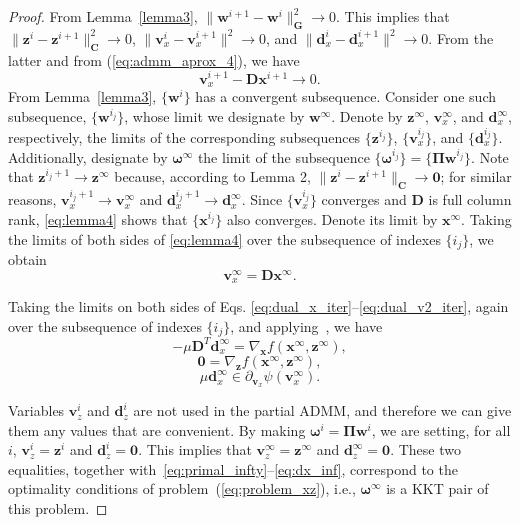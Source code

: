 \documentclass[10pt,twocolumn,twoside]{IEEEtran}
\newcommand{\x}{\mathbf{x}} %
\newcommand{\z}{\mathbf{z}} %
\newcommand{\vs}{\mathbf{v}} %
\newcommand{\dv}{\mathbf{d}} %
\newcommand{\D}{\mathbf{D}} %
\newcommand{\wt}{\mathbf{w}} %
\newcommand{\C}{\mathbf{C}} %
\newcommand{\G}{\mathbf{G}} %
\begin{document}
\begin{proof}
	From Lemma~\ref{lemma3}, $\|\wt^{i+1} - \wt^i \|^2_{\G} \to 0$. This implies that $\| \z^i - \z^{i+1} \|^2_\C \to 0$, $\| \vs_x^i - \vs_x^{i+1} \|^2 \to 0$, and $\| \dv_x^i - \dv_x^{i+1} \|^2 \to 0$. From the latter and from (\ref{eq:admm_aprox_4}), we have
	\begin{equation} \label{eq:lemma4}
	\vs_x^{i+1} - \D \x^{i+1} \to 0.
	\end{equation}
	From Lemma~\ref{lemma3}, $\{\wt^i\}$ has a convergent subsequence. Consider one such subsequence, $\{\wt^{i_j}\}$, whose limit we designate by $\wt^{\infty}$. Denote by $\z^{\infty}$, $\vs_x^{\infty}$, and $\dv_x^{\infty}$, respectively, the limits of the corresponding subsequences $\{\z^{i_j}\}$, $\{\vs_x^{i_j}\}$, and $\{\dv_x^{i_j}\}$. Additionally, designate by $\bm{\omega}^{\infty}$ the limit of the subsequence $\{\bm{\omega}^{i_j}\} = \{\bm{\Pi} \wt^{i_j}\}$. Note that $\z^{i_j+1} \to \z^\infty$ because, according to Lemma 2, $\|\z^i - \z^{i+1}\|_\C \to \mathbf 0$; for similar reasons, $\vs_x^{i_j+1} \to \vs_x^\infty$ and $\dv_x^{i_j+1} \to \dv_x^\infty$. Since $\{\vs_x^{i_j}\}$ converges and $\D$ is full column rank, \eqref{eq:lemma4} shows that $\{\x^{i_j}\}$ also converges. Denote its limit by $\x^\infty$. Taking the limits of both sides of \eqref{eq:lemma4} over the subsequence of indexes $\{i_j\}$, we obtain
	\begin{equation} \label{eq:primal_infty}
	\vs_x^{\infty} = \D \x^{\infty}.
	\end{equation}

	Taking the limits on both sides of Eqs. \eqref{eq:dual_x_iter}--\eqref{eq:dual_v2_iter}, again over the subsequence of indexes $\{i_j\}$, and applying~\cite[Theorem 24.4]{Rockafellar1970}, we have
	\begin{equation}
	- \mu \D^{T} \dv_x^{\infty} = \nabla_{\x} f(\x^{\infty}, \z^{\infty}),
	\end{equation}
	\begin{equation}
	\mathbf 0 = \nabla_\z f(\x^{\infty}, \z^{\infty}),
	\end{equation}
	\begin{equation} \label{eq:dx_inf}
	\mu \dv_x^{\infty} \in \partial_{\vs_x} \psi(\vs_x^{\infty}).
	\end{equation}

	Variables $\vs_z^i$ and $\dv_z^i$ are not used in the partial ADMM, and therefore we can give them any values that are convenient. By making $\bm{\omega}^i = \bm{\Pi} \wt^i$, we are setting, for all $i$, $\vs_z^i = \z^i$ and $\dv_z^i = \mathbf 0$. This implies that $\vs_z^{\infty} = \z^{\infty}$ and $\dv_z^{\infty} = \mathbf 0$. These two equalities, together with~\eqref{eq:primal_infty}--\eqref{eq:dx_inf}, correspond to the optimality conditions of problem~(\ref{eq:problem_xz}), i.e., $\bm{\omega}^{\infty}$ is a KKT pair of this problem.
\end{proof}
\end{document}
